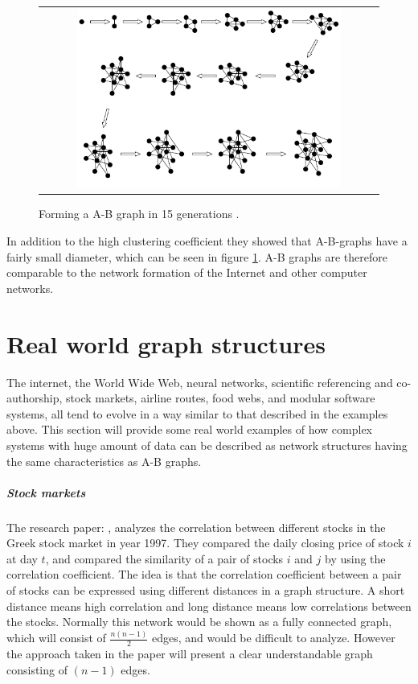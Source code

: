 \begin{figure}[h]
\centering
\begin{tabular}{@{}c@{}}
\includegraphics[width=0.8\textwidth]{../Figures/ABgraphcreation.png}
\end{tabular}
\caption{\label{fig:ABgraphcreation} Forming a A-B graph in 15 generations \cite{audestad}.}
\end{figure}

In addition to the high clustering coefficient they showed that A-B-graphs have a fairly small diameter,
 which can be seen in figure \ref{fig:ABgraphcreation}. 
 A-B graphs are therefore comparable to the network formation of the Internet and other computer networks. 
 
\section{Real world graph structures}

The internet, the World Wide Web, neural networks, scientific referencing and co-authorship, stock markets, airline routes, food 
webs, and modular software systems, all tend to evolve in a way similar to that described in the examples 
above. This section will provide some real world examples of how complex systems with huge amount of data can be described as network structures having the same characteristics as A-B graphs.
\subparagraph{Stock markets} The research paper: \cite{greekStockMarket}, analyzes the correlation between different stocks in the Greek stock market in year 1997. They compared the daily closing price of stock $i$ at day $t$, and compared the similarity of a pair of stocks $i$ and $j$ by using the correlation coefficient. The idea is that the correlation coefficient between a pair of stocks can be expressed using different distances in a graph structure. A short distance means high correlation and long distance means low correlations between the stocks. Normally this network would be shown as a fully connected graph, which will consist of $\frac{n(n-1)}{2}$ edges, and would be difficult to analyze. However the approach taken in the paper will present a clear understandable graph consisting of $(n-1)$ edges.

